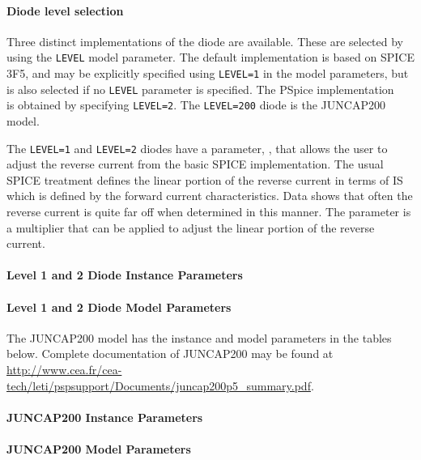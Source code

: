 \paragraph{Diode level selection}

Three distinct implementations of the diode are available.  These are
selected by using the \verb|LEVEL| model parameter.  The default
implementation is based on SPICE 3F5, and may be explicitly specified
using \verb|LEVEL=1| in the model parameters, but is also selected if no
\verb|LEVEL| parameter is specified.  The PSpice implementation
~\cite{PSpiceUG:1998} is obtained by specifying \verb|LEVEL=2|.
The \Xyce{} \verb|LEVEL=200| diode is the JUNCAP200 model.

The \Xyce{} \verb|LEVEL=1| and \verb|LEVEL=2| diodes have a parameter,
, that allows the user to adjust the reverse current from the basic
SPICE implementation.  The usual SPICE treatment defines the linear
portion of the reverse current in terms of IS which is defined by the
forward current characteristics.  Data shows that often the reverse
current is quite far off when determined in this manner.  The
parameter  is a multiplier that can be applied to adjust the linear
portion of the reverse current.


\pagebreak

\paragraph{Level 1 and 2 Diode Instance Parameters}


\paragraph{Level 1 and 2 Diode Model Parameters}


The JUNCAP200 model has the instance and model parameters in the
tables below.  Complete documentation of JUNCAP200 may be found at
\url{http://www.cea.fr/cea-tech/leti/pspsupport/Documents/juncap200p5_summary.pdf}.

\paragraph{JUNCAP200 Instance Parameters}


\paragraph{JUNCAP200 Model Parameters}


